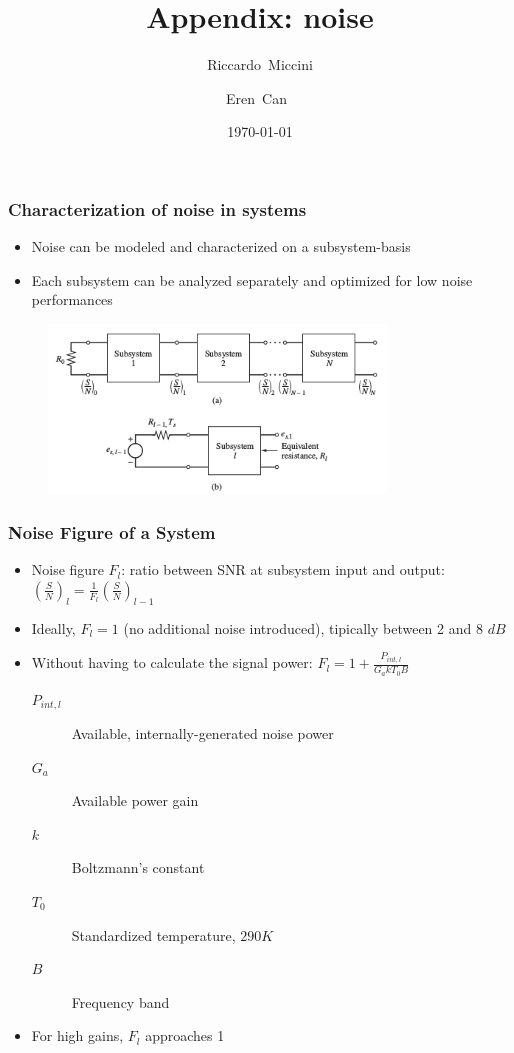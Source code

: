 \documentclass{beamer}
\title{Appendix: noise}
\subtitle{}
\author[Riccardo \and Eren]{Riccardo~Miccini\inst{1} \and Eren~Can~\inst{1}}
\institute[DTU]
{
	\inst{1}
	Technical University of Denmark\\
	Digital Communication
}
\date{\today}
\begin{document}
\frame{\titlepage}

\begin{frame}
	\frametitle{Characterization of noise in systems}
	\begin{itemize}
		\item Noise can be modeled and characterized on a subsystem-basis
		\item Each subsystem can be analyzed separately and optimized for low noise performances
	\end{itemize}
	\begin{figure}
		\includegraphics[width=0.8\textwidth]{subsys.png}
	\end{figure}
\end{frame}


\begin{frame}
	\frametitle{Noise Figure of a System}
	\begin{itemize}
		\item Noise figure $F_l$: ratio between SNR at subsystem input and output: $ \left(\frac{S}{N}\right)_l = \frac{1}{F_l} \left(\frac{S}{N}\right)_{l-1} $
		\item Ideally, $ F_l = 1 $ (no additional noise introduced), tipically between 2 and 8 $dB$
		\item Without having to calculate the signal power: $ F_l = 1 + \frac{P_{int,l}}{G_a k T_0 B} $
		\begin{description}
			\item[$P_{int,l}$] Available, internally-generated noise power
			\item[$G_a$] Available power gain
			\item[$k$] Boltzmann's constant
			\item[$T_0$] Standardized temperature, $290 K$
			\item[$B$] Frequency band
		\end{description}
		\item For high gains, $F_l$ approaches 1
	\end{itemize}
\end{frame}
\end{document}
